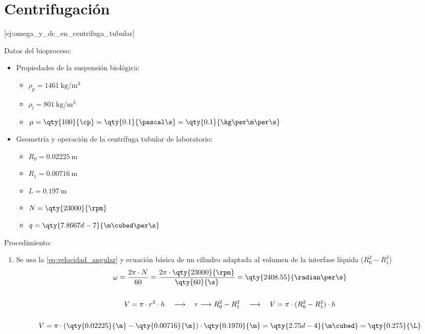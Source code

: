 

    \section{Centrifugación}


[ej:omega_y_dc_en_centrifuga_tubular]{
    Datos del bioproceso:
    \begin{itemize}
    \item Propiedades de la suspensión biológica:
	    \begin{itemize}
	        \item $\rho_{p} = \qty{1461}{\kg\per\m\cubed}$
	        \item $\rho_{l} =  \qty{801}{\kg\per\m\cubed}$
	        \item $\mu = \qty{100}{\cp} = \qty{0.1}{\pascal\s} = \qty{0.1}{\kg\per\m\per\s}$
	    \end{itemize}    
    \item Geometría y operación de la centrífuga tubular de laboratorio:
	    \begin{itemize}
	        \item $R_{0} = \qty{0.02225}{\m}$
	        \item $R_{1} = \qty{0.00716}{\m}$
	        \item $L = \qty{0.197}{\m}$
	        \item $N = \qty{23000}{\rpm}$ 
	        \item $q = \qty{7.8667d-7}{\m\cubed\per\s}$
        \end{itemize}
    \end{itemize}
    Procedimiento:
    \begin{enumerate}
        \item Se usa la \autoref{eq:velocidad_angular} y ecuación básica de un cilindro adaptada al volumen de la interfase líquida ($R_{0}^{2} - R_{1}^{2}$) \begin{gather*}
            \omega = \frac{2\pi \cdot N}{60} = \frac{2\pi \cdot \qty{23000}{\rpm}}{\qty{60}{\s}} = \qty{2408.55}{\radian\per\s}
            \\\\
            V = \pi \cdot r^{2} \cdot h \quad\longrightarrow\quad r \longrightarrow R_{0}^{2} - R_{1}^{2} \quad\longrightarrow\quad V = \pi \cdot (R_{0}^{2} - R_{1}^{2}) \cdot h 
            \\\\
            V = \pi\cdot(\qty{0.02225}{\m}-\qty{0.00716}{\m})\cdot \qty{0.1970}{\m}=\qty{2.75d-4}{\m\cubed}=\qty{0.275}{\L}

\end{gather*}
\end{enumerate}}
